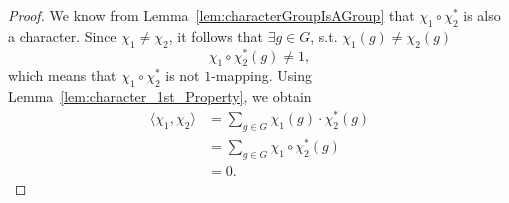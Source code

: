 \documentclass{article}
\theoremstyle{definition}
\numberwithin{equation}{theorem}
\numberwithin{figure}{theorem}
\newcommand{\bilinearForm}[2]{\ensuremath{\langle#1,#2\rangle}}
\newcommand{\composition}[2]{\ensuremath{#1\circ#2}}
\begin{document}
    \begin{proof}
        We know from Lemma~\ref{lem:characterGroupIsAGroup} that $\composition{\chi_1}{\chi_2^{*}}$ is also a character.
        Since $\chi_1 \neq \chi_2$, it follows that $\exists g \in G$, s.t. $\chi_1(g) \neq \chi_2(g)$
        \[\composition{\chi_1}{\chi_2^{*}}(g) \neq 1,\]
        which means that $\composition{\chi_1}{\chi_2^{*}} $ is not $1$-mapping.
        Using Lemma~\ref{lem:character_1st_Property}, we obtain
        \begin{align*}
            \bilinearForm{\chi_1}{\chi_2} &= \sum_{g \in G} \chi_1(g) \cdot \chi_2^{*}(g)\\
            &= \sum_{g \in G} \composition{\chi_1}{\chi_2^{*}(g)} \\
            &= 0.
        \end{align*}
    \end{proof}
\end{document}
